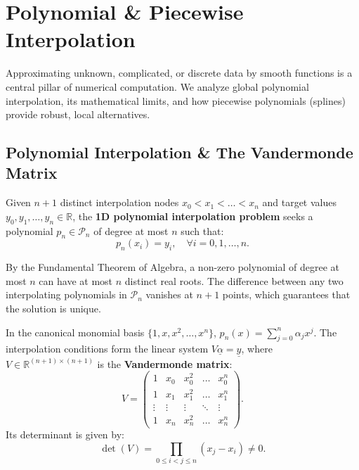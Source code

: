 \section{Polynomial \& Piecewise Interpolation}

Approximating unknown, complicated, or discrete data by smooth functions is a central pillar of numerical computation. We analyze global polynomial interpolation, its mathematical limits, and how piecewise polynomials (splines) provide robust, local alternatives.

\subsection{Polynomial Interpolation \& The Vandermonde Matrix}

\begin{definition}
    Given $n+1$ distinct interpolation nodes $x_0 < x_1 < \dots < x_n$ and target values $y_0, y_1, \dots, y_n \in \mathbb{R}$, the \textbf{1D polynomial interpolation problem} seeks a polynomial $p_n \in \mathcal{P}_n$ of degree at most $n$ such that:
    \begin{equation}
        p_n(x_i) = y_i, \quad \forall i = 0, 1, \dots, n.
    \end{equation}
\end{definition}

By the Fundamental Theorem of Algebra, a non-zero polynomial of degree at most $n$ can have at most $n$ distinct real roots. The difference between any two interpolating polynomials in $\mathcal{P}_n$ vanishes at $n+1$ points, which guarantees that the solution is unique.

In the canonical monomial basis $\{1, x, x^2, \dots, x^n\}$, $p_n(x) = \sum_{j=0}^{n} \alpha_j x^j$. The interpolation conditions form the linear system $V \underline{\alpha} = \underline{y}$, where $V \in \mathbb{R}^{(n+1) \times (n+1)}$ is the \textbf{Vandermonde matrix}:
\begin{equation}
    V = \begin{pmatrix}
        1 & x_0 & x_0^2 & \dots & x_0^n \\
        1 & x_1 & x_1^2 & \dots & x_1^n \\
        \vdots & \vdots & \vdots & \ddots & \vdots \\
        1 & x_n & x_n^2 & \dots & x_n^n
    \end{pmatrix}.
\end{equation}
Its determinant is given by:
\begin{equation}
    \det(V) = \prod_{0 \le i < j \le n} (x_j - x_i) \neq 0.
\end{equation}

